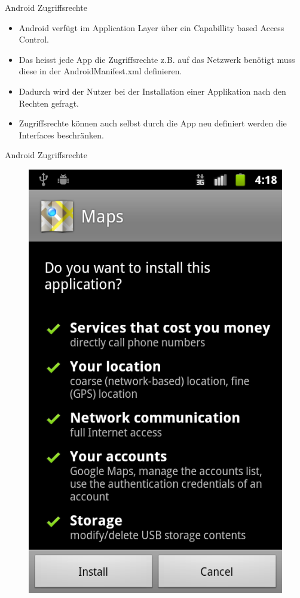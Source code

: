 \documentclass{beamer}
\begin{document}
\begin{frame}{Android Zugriffsrechte}
\begin{itemize}
\item Android verfügt im Application Layer über ein Capabillity based Access Control.
\item Das heisst jede App die Zugriffsrechte z.B. auf das Netzwerk benötigt muss diese in der
AndroidManifest.xml definieren.
\item Dadurch wird der Nutzer bei der Installation einer Applikation nach den Rechten gefragt.
\item Zugriffsrechte können auch selbst durch die App neu definiert werden die Interfaces beschränken.
\end{itemize}
\end{frame}

\begin{frame}{Android Zugriffsrechte}
\begin{figure}[hb]
 \centering
 \includegraphics[scale=0.23]{android-perms}
\end{figure}
\end{frame}
\end{document}
